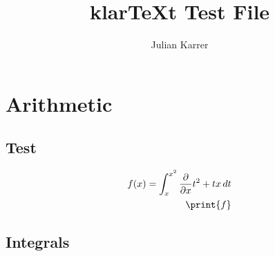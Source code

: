 \documentclass[oneside, a4paper]{article}
\author{Julian Karrer}
\title{klarTeXt Test File}
\begin{document}
\maketitle

\section*{Arithmetic}

\subsection*{Test}
\begin{program}
    \begin{align*}
        f(x)=\int_{x}^{x^2} \ddx{x} t^2+tx\,dt\\
        \print{f}
    \end{align*}
\end{program}

\subsection*{Integrals}


\end{document}
